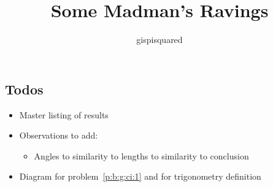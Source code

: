 \documentclass{amsbook}
\title{Some Madman's Ravings}
\author{gispisquared}
\numberwithin{section}{chapter}
\begin{document}
\maketitle
\tableofcontents






\appendix


\subsection*{Todos}
\begin{itemize}
  \item Master listing of results
  \item Observations to add:
    \begin{itemize}
      \item Angles to similarity to lengths to similarity to conclusion
    \end{itemize}
  \item Diagram for problem~\ref{p:b:g:ci:1} and for trigonometry definition
\end{itemize}
\end{document}
